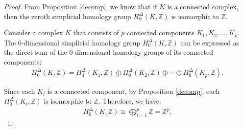 \begin{proof}
	From Proposition \ref{decomp}, we know that if \( K \) is a connected complex, then the zeroth simplicial homology group \( H^{\Delta}_{0}(K, \mathbb{Z}) \) is isomorphic to \( \mathbb{Z} \).
				
	Consider a complex \( K \) that consists of \( p \) connected components \( K_1, K_2, \ldots, K_p \). The $0$-dimensional simplicial homology group \( H^{\Delta}_{0}(K, \mathbb{Z}) \) can be expressed as the direct sum of the $0$-dimensional homology groups of its connected components:
	\begin{align}
		H^{\Delta}_{0}(K, \mathbb{Z}) = H^{\Delta}_{0}(K_1, \mathbb{Z}) \oplus H^{\Delta}_{0}(K_2, \mathbb{Z}) \oplus \cdots \oplus H^{\Delta}_{0}(K_p, \mathbb{Z}). 
	\end{align}
				
	Since each \( K_i \) is a connected component, by Proposition \ref{decomp}, each \( H^{\Delta}_{0}(K_i, \mathbb{Z}) \) is isomorphic to \( \mathbb{Z} \). Therefore, we have:
	\begin{align}
		H^{\Delta}_{0}(K, \mathbb{Z}) \cong \bigoplus_{i=1}^p \mathbb{Z} = \mathbb{Z}^{p}. 
	\end{align}
\end{proof}

